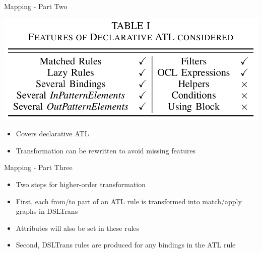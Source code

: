 \documentclass[xcolor=dvipsnames, 12pt]{beamer}
\begin{document}
\begin{frame}{Mapping - Part Two}
\begin{center}
\includegraphics[width=\textwidth]{figures/features}
\end{center}

\begin{itemize}
\item Covers declarative ATL
\item Transformation can be rewritten to avoid missing features
\end{itemize}
\end{frame}

\begin{frame}{Mapping - Part Three}
\begin{itemize}[<+->]
\item Two steps for higher-order transformation
\item First, each from/to part of an ATL rule is transformed into match/apply graphs in DSLTrans
\item Attributes will also be set in these rules
\item Second, DSLTrans rules are produced for any bindings in the ATL rule
\end{itemize}


\end{frame}
\end{document}
